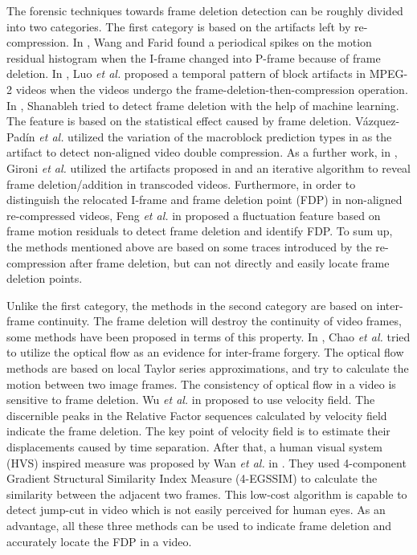 \documentclass[pdftex,twocolumn,epjc3]{svjour3}          %
\begin{document}
The forensic techniques towards frame deletion detection can be roughly divided into two categories.
The first category is based on the artifacts left by re-compression. In \cite{A4}, Wang and Farid found a periodical spikes on the motion residual histogram when the I-frame changed into P-frame because of frame deletion. In \cite{A5}, Luo \emph{et al.} proposed a temporal pattern of block artifacts in MPEG-2 videos when the videos undergo the frame-deletion-then-compression operation. In \cite{A6}, Shanableh tried to detect frame deletion with the help of machine learning. The feature is based on the statistical effect caused by frame deletion. V{\'a}zquez-Pad{\'i}n \emph{et al.} utilized the variation of the macroblock prediction types in \cite{A7} as the artifact to detect non-aligned video double compression. As a further work, in \cite{A8}, Gironi \emph{et al.} utilized the artifacts proposed in \cite{A7} and an iterative algorithm to reveal frame deletion/addition in transcoded videos. Furthermore, in order to distinguish the relocated I-frame and frame deletion point (FDP) in non-aligned re-compressed videos, Feng \emph{et al.} in \cite{A9} proposed a fluctuation feature based on frame motion residuals to detect frame deletion and identify FDP. To sum up, the methods mentioned above are based on some traces introduced by the re-compression after frame deletion, but can not directly and easily locate frame deletion points.

Unlike the first category, the methods in the second category are based on inter-frame continuity. The frame deletion will destroy the continuity of video frames, some methods have been proposed in terms of this property.
In \cite{A10}, Chao \emph{et al.} tried to utilize the optical flow as an evidence for inter-frame forgery. The optical flow methods are based on local Taylor series approximations, and try to calculate the motion between two image frames. The consistency of optical flow in a video is sensitive to frame deletion. Wu \emph{et al.} in \cite{A11} proposed to use velocity field. The discernible peaks in the Relative Factor sequences calculated by velocity field indicate the frame deletion. The key point of velocity field is to estimate their displacements caused by time separation. After that, a human visual system (HVS) inspired measure was proposed by Wan \emph{et al.} in \cite{A12}. They used 4-component Gradient Structural Similarity Index Measure (4-EGSSIM) to calculate the similarity between the adjacent two frames. This low-cost algorithm is capable to detect jump-cut in video which is not easily perceived for human eyes. As an advantage, all these three methods can be used to indicate frame deletion and accurately locate the FDP in a video.
\end{document}
